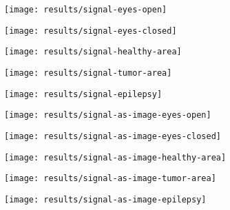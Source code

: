 \documentclass[conference]{IEEEtran}
\begin{document}
\begin{figure*}[!t]
	\centering
	\begin{subfigure}{0.19\linewidth}
		\centering
		\texttt{[image: results/signal-eyes-open]}
	\end{subfigure}
	\begin{subfigure}{0.19\linewidth}
		\centering
		\texttt{[image: results/signal-eyes-closed]}
	\end{subfigure}
	\begin{subfigure}{0.19\linewidth}
		\centering
		\texttt{[image: results/signal-healthy-area]}
	\end{subfigure}
	\begin{subfigure}{0.19\linewidth}
		\centering
		\texttt{[image: results/signal-tumor-area]}
	\end{subfigure}
	\begin{subfigure}{0.19\linewidth}
		\centering
		\texttt{[image: results/signal-epilepsy]}
	\end{subfigure}

	\begin{subfigure}{0.19\linewidth}
		\centering
		\texttt{[image: results/signal-as-image-eyes-open]}
	\end{subfigure}
	\begin{subfigure}{0.19\linewidth}
		\centering
		\texttt{[image: results/signal-as-image-eyes-closed]}
	\end{subfigure}
	\begin{subfigure}{0.19\linewidth}
		\centering
		\texttt{[image: results/signal-as-image-healthy-area]}
	\end{subfigure}
	\begin{subfigure}{0.19\linewidth}
		\centering
		\texttt{[image: results/signal-as-image-tumor-area]}
	\end{subfigure}
	\begin{subfigure}{0.19\linewidth}
		\centering
		\texttt{[image: results/signal-as-image-epilepsy]}
	\end{subfigure}


\end{figure*}
\end{document}
